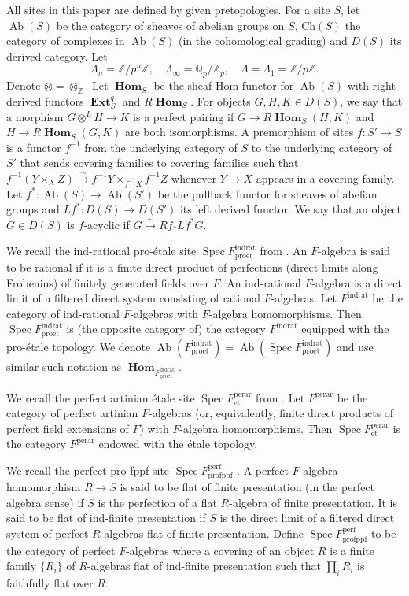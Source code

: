 \documentclass{amsart}
\theoremstyle{remark}
\numberwithin{equation}{section}
\newcommand{\isomto}{\overset{\sim}{\to}}
\newcommand{\tensor}{\mathbin{\otimes}}
\newcommand{\Z}{\mathbb{Z}}
\newcommand{\Q}{\mathbb{Q}}
\newcommand{\et}{\mathrm{et}}
\newcommand{\fppf}{\mathrm{fppf}}
\newcommand{\rat}{\mathrm{rat}}
\newcommand{\ind}{\mathrm{ind}}
\newcommand{\pro}{\mathrm{pro}}
\newcommand{\perf}{\mathrm{perf}}
\newcommand{\perar}{\mathrm{perar}}
\newcommand{\alg}[1]{\mathbf{#1}}
\newcommand{\Ch}{\mathrm{Ch}}
\DeclareMathOperator{\Spec}{Spec}
\DeclareMathOperator{\Ab}{Ab}
\DeclareMathOperator{\sheafhom}{\alg{Hom}}
\DeclareMathOperator{\sheafext}{\alg{Ext}}
\begin{document}
All sites in this paper are defined by given pretopologies.
For a site $S$, let $\Ab(S)$ be the category of sheaves of abelian groups on $S$,
$\Ch(S)$ the category of complexes in $\Ab(S)$ (in the cohomological grading)
and $D(S)$ its derived category.
Let
	\[
			\Lambda_{n}
		=
			\Z / p^{n} \Z,
		\quad
			\Lambda_{\infty}
		=
			\Q_{p} / \Z_{p},
		\quad
			\Lambda
		=
			\Lambda_{1}
		=
			\Z / p \Z.
	\]
Denote $\tensor = \tensor_{\Z}$.
Let $\sheafhom_{S}$ be the sheaf-Hom functor for $\Ab(S)$
with right derived functors $\sheafext_{S}^{q}$ and $R \sheafhom_{S}$.
For objects $G, H, K \in D(S)$,
we say that a morphism $G \tensor^{L} H \to K$ is a perfect pairing
if $G \to R \sheafhom_{S}(H, K)$ and $H \to R \sheafhom_{S}(G, K)$ are
both isomorphisms.
A premorphism of sites $f \colon S' \to S$ is a functor $f^{-1}$
from the underlying category of $S$ to the underlying category of $S'$
that sends covering families to covering families
such that $f^{-1}(Y \times_{X} Z) \isomto f^{-1} Y \times_{f^{-1} X} f^{-1} Z$
whenever $Y \to X$ appears in a covering family.
Let $f^{\ast} \colon \Ab(S) \to \Ab(S')$ be the pullback functor for sheaves of abelian groups
and $L f^{\ast} \colon D(S) \to D(S')$ its left derived functor.
We say that an object $G \in D(S)$ is $f$-acyclic
if $G \isomto R f_{\ast} L f^{\ast} G$.

We recall the ind-rational pro-\'etale site $\Spec F^{\ind\rat}_{\pro\et}$ from \cite{Suz20}.
An $F$-algebra is said to be rational if it is a finite direct product of
perfections (direct limits along Frobenius) of finitely generated fields over $F$.
An ind-rational $F$-algebra is a direct limit of a filtered direct system consisting of
rational $F$-algebras.
Let $F^{\ind\rat}$ be the category of ind-rational $F$-algebras
with $F$-algebra homomorphisms.
Then $\Spec F^{\ind\rat}_{\pro\et}$ is (the opposite category of) the category $F^{\ind\rat}$
equipped with the pro-\'etale topology.
We denote $\Ab(F^{\ind\rat}_{\pro\et}) = \Ab(\Spec F^{\ind\rat}_{\pro\et})$
and use similar such notation as $\sheafhom_{F^{\ind\rat}_{\pro\et}}$.

We recall the perfect artinian \'etale site $\Spec F^{\perar}_{\et}$
from \cite{Suz21Imp}.
Let $F^{\perar}$ be the category of perfect artinian $F$-algebras
(or, equivalently, finite direct products of perfect field extensions of $F$)
with $F$-algebra homomorphisms.
Then $\Spec F^{\perar}_{\et}$ is the category $F^{\perar}$ endowed with the \'etale topology.

We recall the perfect pro-fppf site $\Spec F^{\perf}_{\pro\fppf}$ \cite{Suz22}.
A perfect $F$-algebra homomorphism $R \to S$ is said to be
flat of finite presentation (in the perfect algebra sense)
if $S$ is the perfection of a flat $R$-algebra of finite presentation.
It is said to be flat of ind-finite presentation
if $S$ is the direct limit of a filtered direct system of perfect $R$-algebras
flat of finite presentation.
Define $\Spec F^{\perf}_{\pro\fppf}$ to be the category of perfect $F$-algebras
where a covering of an object $R$ is a finite family $\{R_{i}\}$ of $R$-algebras
flat of ind-finite presentation such that $\prod_{i} R_{i}$ is faithfully flat over $R$.
\end{document}
